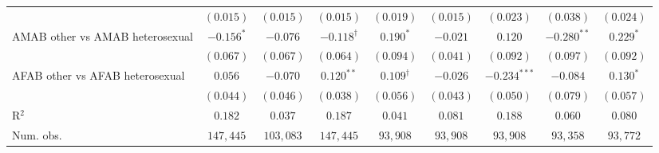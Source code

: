 \begin{table}[htpb!]
{\begin{tabular}{l c c c c c c c c}
 & $(0.015)$ & $(0.015)$ & $(0.015)$ & $(0.019)$ & $(0.015)$ & $(0.023)$ & $(0.038)$ & $(0.024)$ \\
AMAB other vs AMAB heterosexual & $-0.156^{*}$ & $-0.076$ & $-0.118^{\dagger}$ & $0.190^{*}$ & $-0.021$ & $0.120$ & $-0.280^{**}$ & $0.229^{*}$ \\
 & $(0.067)$ & $(0.067)$ & $(0.064)$ & $(0.094)$ & $(0.041)$ & $(0.092)$ & $(0.097)$ & $(0.092)$ \\
AFAB other vs AFAB heterosexual & $0.056$ & $-0.070$ & $0.120^{**}$ & $0.109^{\dagger}$ & $-0.026$ & $-0.234^{***}$ & $-0.084$ & $0.130^{*}$ \\
 & $(0.044)$ & $(0.046)$ & $(0.038)$ & $(0.056)$ & $(0.043)$ & $(0.050)$ & $(0.079)$ & $(0.057)$ \\
\hline
R$^2$ & $0.182$ & $0.037$ & $0.187$ & $0.041$ & $0.081$ & $0.188$ & $0.060$ & $0.080$ \\
Num. obs. & $147,445$ & $103,083$ & $147,445$ & $93,908$ & $93,908$ & $93,908$ & $93,358$ & $93,772$ \\
\hline
\end{tabular}%
}
\par\vspace{1ex}
\begin{minipage}{\textwidth}\footnotesize\raggedright

\end{minipage}
\end{table}
